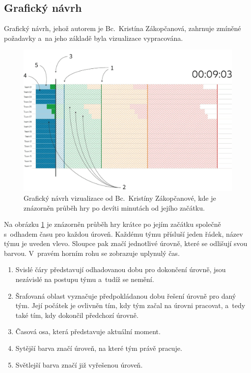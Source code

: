 \documentclass[
  digital, %
  oneside, %
  table,   %
  nolof,     %
  nolot,     %
]{fithesis3}
\begin{document}
\subsection{Grafický návrh}
Grafický návrh, jehož autorem je Bc.~Kristína Zákopčanová, zahrnuje zmíněné požadavky a~na jeho základě byla vizualizace vypracována.\par
\begin{figure}[h]
  \begin{center}
    \includegraphics[width=12.7cm]{images/navrh-vizualizace-1-4.png}
  \end{center}
  \caption{Grafický návrh vizualizace od Bc.~Kristíny Zákopčanové, kde je znázorněn průběh hry po devíti minutách od jejího začátku.}
  \label{fig:progress1}
\end{figure}
Na obrázku \ref{fig:progress1} je znázorněn průběh hry krátce po jejím začátku společně s~odhadem času pro každou úroveň. Každému týmu přísluší jeden řádek, název týmu je uveden vlevo. Sloupce pak značí jednotlivé úrovně, které se odlišují svou barvou. V~pravém horním rohu se zobrazuje uplynulý čas.
\begin{enumerate}
  \item Svislé čáry představují odhadovanou dobu pro dokončení úrovně, jsou nezávislé na postupu týmu a~tudíž se nemění.
  \item Šrafovaná oblast vyznačuje předpokládanou dobu řešení úrovně pro daný tým. Její počátek je ovlivněn tím, kdy tým začal na úrovni pracovat, a~tedy také tím, kdy dokončil předchozí úrovně.
  \item Časová osa, která představuje aktuální moment.
  \item Sytější barva značí úroveň, na které tým právě pracuje.
  \item Světlejší barva značí již vyřešenou úroveň.
\end{enumerate}
\end{document}
